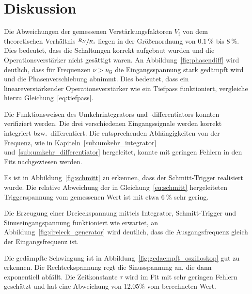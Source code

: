 \section{Diskussion}%
\label{sec:diskussion}


Die Abweichungen der gemessenen Verstärkungsfaktoren $V_i$
von dem theoretischen Verhältnis $\sfrac{R_N}{R_1}$ liegen
in der Größenordnung von $\SI{0.1}{\percent}$ bis $\SI{8}{\percent}$.
Dies bedeutet, dass die Schaltungen korrekt aufgebaut wurden und die Operationsverstärker nicht gesättigt waren.
An Abbildung~\ref{fig:phasendiff} wird deutlich,
dass für Frequenzen $\nu > \nu_\text{G}$
die Eingangsspannung stark gedämpft wird und die Phasenverschiebung abnimmt.
Dies bedeutet, dass ein lineareverstärkender Operationsverstärker wie ein Tiefpass funktioniert, vergleiche hierzu Gleichung~\eqref{eq:tiefpass}.


Die Funktionsweisen des Umkehrintegrators und -differentiators konnten verifiziert werden.
Die drei verschiedenen Eingangssignale werden korrekt integriert bzw.\ differentiert.
Die entsprechenden Abhängigkeiten von der Frequenz, wie in Kapiteln~\ref{sub:umkehr_integrator} und~\ref{sub:umkehr_differentiator} hergeleitet,
konnte mit geringen Fehlern in den Fits nachgewiesen werden.

Es ist in Abbildung~\ref{fig:schmitt} zu erkennen,
dass der Schmitt-Trigger realisiert wurde.
Die relative Abweichung der in Gleichung~\eqref{eq:schmitt}
hergeleiteten Triggerspannung vom gemessenen Wert ist
mit etwa $\SI{6}{\percent}$ sehr gering.

Die Erzeugung einer Dreieckspannung mittels Integrator, Schmitt-Trigger und Sinuseingangspannung funktioniert wie erwartet,
an Abbildung~\ref{fig:dreieck_generator} wird deutlich,
dass die Ausgangsfrequenz gleich der Eingangsfrequenz ist.

Die gedämpfte Schwingung ist in Abbildung~\ref{fig:gedaempft_oszilloskop}
gut zu erkennen.
Die Rechteckspannung regt die Sinusspannung an,
die dann exponentiell abfällt.
Die Zeitkonstante $\tau$ wird im Fit mit sehr geringen Fehlern geschätzt
und hat eine Abweichung von \num{12.05}\% vom berechneten Wert.
